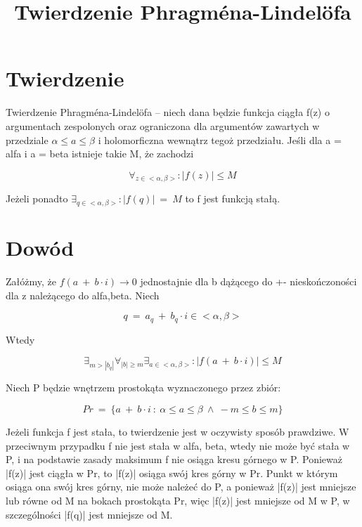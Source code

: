 \documentclass{article}
\begin{document}
\title{Twierdzenie Phragména-Lindelöfa}
\maketitle

\section*{Twierdzenie}
Twierdzenie Phragména-Lindelöfa – niech dana będzie funkcja ciągła f(z) o argumentach zespolonych oraz ograniczona dla argumentów zawartych w przedziale \(\alpha \leq a\leq \beta\) i holomorficzna wewnątrz tegoż przedziału. Jeśli dla a = alfa i a = beta istnieje takie M, że zachodzi

\[\forall _{z\in <\alpha ,\beta >}\colon |f(z)|\leq M\]

Jeżeli ponadto $\exists _{q\in <\alpha ,\beta >}\colon |f(q)|\ =\ M$ to f jest funkcją stałą.

\section*{Dowód}
Załóżmy, że $f(a\ +\ b\cdot i)\to 0$ jednostajnie dla b dążącego do +- nieskończoności dla z należącego do alfa,beta. Niech

\begin{displaymath}
	q\ =\ a_{q}\ +\ b_{q}\cdot i\in <\alpha ,\beta >
\end{displaymath}

Wtedy

\begin{equation*}
	\exists _{m>|b_{q}|}\forall _{|b|\geq m}\exists _{a\in <\alpha ,\beta >}\colon |f(a\ +\ b\cdot i)|\leq M
\end{equation*}

Niech P będzie wnętrzem prostokąta wyznaczonego przez zbiór:

\[Pr\ =\ \{a\ +\ b\cdot i\ :\ \alpha \leq a\leq \beta \ \land \ -m\leq b\leq m\}\]

Jeżeli funkcja f jest stała, to twierdzenie jest w oczywisty sposób prawdziwe. W przeciwnym przypadku f nie jest stała w alfa, beta, wtedy nie może być stała w P, i na podstawie zasady maksimum f nie osiąga kresu górnego w P. Ponieważ |f(z)| jest ciągła w Pr, to |f(z)| osiąga swój kres górny w Pr. Punkt w którym osiąga ona swój kres górny, nie może należeć do P, a ponieważ |f(z)| jest mniejsze lub równe od M na bokach prostokąta Pr, więc |f(z)| jest mniejsze od M w P, w szczególności |f(q)| jest mniejsze od M.
\end{document}

